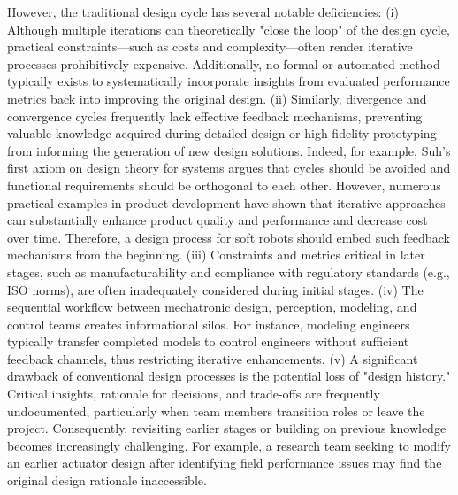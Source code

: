 However, the traditional design cycle has several notable deficiencies:
(i) Although multiple iterations can theoretically "close the loop" of the design cycle, practical constraints—such as costs and complexity—often render iterative processes prohibitively expensive. Additionally, no formal or automated method typically exists to systematically incorporate insights from evaluated performance metrics back into improving the original design.
(ii) Similarly, divergence and convergence cycles frequently lack effective feedback mechanisms, preventing valuable knowledge acquired during detailed design or high-fidelity prototyping from informing the generation of new design solutions.
Indeed, for example, Suh's first axiom on design theory for systems argues that cycles should be avoided and functional requirements should be orthogonal to each other\citep{suh1998axiomatic}.
However, numerous practical examples in product development have shown that iterative approaches can substantially enhance product quality and performance and decrease cost over time. Therefore, a design process for soft robots should embed such feedback mechanisms from the beginning.
(iii) Constraints and metrics critical in later stages, such as manufacturability and compliance with regulatory standards (e.g., \gls{ISO} norms), are often inadequately considered during initial stages.
(iv) The sequential workflow between mechatronic design, perception, modeling, and control teams creates informational silos. For instance, modeling engineers typically transfer completed models to control engineers without sufficient feedback channels, thus restricting iterative enhancements.
(v) A significant drawback of conventional design processes is the potential loss of "design history." Critical insights, rationale for decisions, and trade-offs are frequently undocumented, particularly when team members transition roles or leave the project. Consequently, revisiting earlier stages or building on previous knowledge becomes increasingly challenging. For example, a research team seeking to modify an earlier actuator design after identifying field performance issues may find the original design rationale inaccessible.

